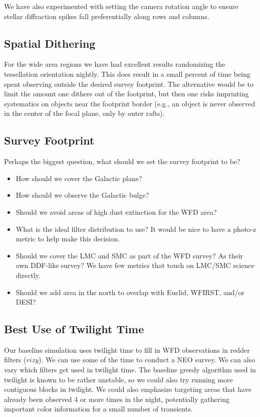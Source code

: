 We have also experimented with setting the camera rotation angle to ensure stellar diffraction spikes fall preferentially along rows and columns. 

\subsection{Spatial Dithering}

For the wide area regions we have had excellent results randomizing the tessellation orientation nightly. This does result in a small percent of time being spent observing outside the desired survey footprint. The alternative would be to limit the amount one dithers out of the footprint, but then one risks imprinting systematics on objects near the footprint border (e.g., an object is never observed in the center of the focal plane, only by outer rafts).

\subsection{Survey Footprint}

Perhaps the biggest question, what should we set the survey footprint to be?

\begin{itemize}
    \item{How should we cover the Galactic plane?}
    \item{How should we observe the Galactic bulge?}
    \item{Should we avoid areas of high dust extinction for the WFD area?}
    \item{What is the ideal filter distribution to use? It would be nice to have a photo-z metric to help make this decision.}
    \item{Should we cover the LMC and SMC as part of the WFD survey? As their own DDF-like survey? We have few metrics that touch on LMC/SMC science directly.}
    \item{Should we add area in the north to overlap with Euclid, WFIRST, and/or DESI?}
\end{itemize}

\subsection{Best Use of Twilight Time}

Our baseline simulation uses twilight time to fill in WFD observations in redder filters ($rizy$). We can use some of the time to conduct a NEO survey. We can also vary which filters get used in twilight time. The baseline greedy algorithm used in twilight is known to be rather unstable, so we could also try running more contiguous blocks in twilight. We could also emphasize targeting areas that have already been observed 4 or more times in the night, potentially gathering important color information for a small number of transients.


